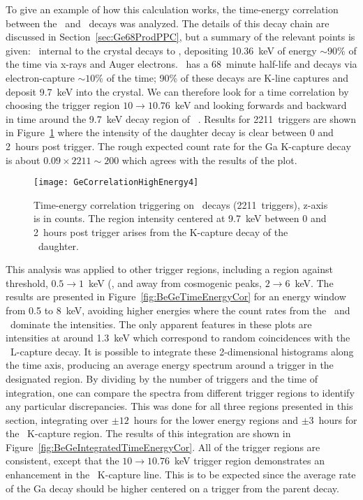 	To give an example of how this calculation works, the time-energy correlation between the \gersixeight~and \galsixeight~decays was analyzed.  The details of this decay chain are discussed in Section~\ref{sec:Ge68ProdPPC}, but a summary of the relevant points is given:  \gersixeight~internal to the crystal decays to \galsixeight, depositing 10.36~keV of energy $\sim90\%$ of the time via x-rays and Auger electrons.  \galsixeight~has a 68~minute half-life and decays via electron-capture $\sim10$\% of the time; 90\% of these decays are K-line captures and deposit 9.7~keV into the crystal.  We can therefore look for a time correlation by choosing the trigger region $10\to10.76$~keV and looking forwards and backward in time around the 9.7~keV decay region of \galsixeight~\cite{Schonfeld1994955}.  Results for 2211~triggers are shown in Figure~\ref{fig:BeGeGeCorrelation} where the intensity of the daughter decay is clear between 0 and 2~hours post trigger.  The rough expected count rate for the Ga K-capture decay is about $0.09\times2211 \sim 200$ which agrees with the results of the plot.  
	

			\begin{figure}
				\centering
				\texttt{[image: GeCorrelationHighEnergy4]}
				\caption[Time-energy correlation triggering on \gersixeight~decays.]
				{Time-energy correlation triggering on \gersixeight~decays (2211~triggers), z-axis is in counts.  The region intensity centered at 9.7~keV between 0 and 2~hours post trigger arises from the K-capture decay of the 
				\galsixeight~daughter.}
				\label{fig:BeGeGeCorrelation}
			\end{figure}	

	This analysis was applied to other trigger regions, including a region against threshold, $0.5\to1$~keV (, and away from cosmogenic peaks, $2\to6$~keV.  The results are presented in Figure~\ref{fig:BeGeTimeEnergyCor} for an energy window from 0.5 to 8~keV, avoiding higher energies where the count rates from the \znsixfive~and \gersixeight~dominate the intensities.  The only apparent features in these plots are intensities at around 1.3~keV which correspond to random coincidences with the \gersixeight~L-capture decay.  It is possible to integrate these 2-dimensional histograms along the time axis, producing an average energy spectrum around a trigger in the designated region.  By dividing by the number of triggers and the time of integration, one can compare the spectra from different trigger regions to identify any particular discrepancies.  This was done for all three regions presented in this section, integrating over $\pm12$~hours for the lower energy regions and $\pm3$~hours for the \gersixeight~K-capture region.  The results of this integration are shown in Figure~\ref{fig:BeGeIntegratedTimeEnergyCor}.  All of the trigger regions are consistent, except that the $10\to10.76$~keV trigger region demonstrates an enhancement in the \galsixeight~K-capture line.  This is to be expected since the average rate of the Ga decay should be higher centered on a trigger from the parent decay.

